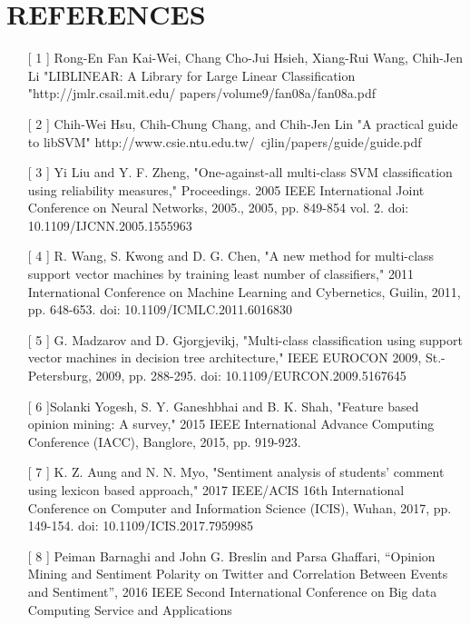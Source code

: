 \chapter{REFERENCES}
\begin{enumerate}
\item[[ 1]]{ Rong-En Fan Kai-Wei, Chang Cho-Jui Hsieh, Xiang-Rui Wang, Chih-Jen Li "LIBLINEAR: A Library for Large Linear Classification "http://jmlr.csail.mit.edu/
papers/volume9/fan08a/fan08a.pdf}

\item[[ 2]]{  Chih-Wei Hsu, Chih-Chung Chang, and Chih-Jen Lin "A practical guide to libSVM" http://www.csie.ntu.edu.tw/~cjlin/papers/guide/guide.pdf}

\item[[ 3]]{ Yi Liu and Y. F. Zheng, "One-against-all multi-class SVM classification using reliability measures," Proceedings. 2005 IEEE International Joint Conference on Neural Networks, 2005., 2005, pp. 849-854 vol. 2.
doi: 10.1109/IJCNN.2005.1555963}

\item[[ 4]]{ R. Wang, S. Kwong and D. G. Chen, "A new method for multi-class support vector machines by training least number of classifiers," 2011 International Conference on Machine Learning and Cybernetics, Guilin, 2011, pp. 648-653.
doi: 10.1109/ICMLC.2011.6016830}

\item[[ 5]]{ G. Madzarov and D. Gjorgjevikj, "Multi-class classification using support vector machines in decision tree architecture," IEEE EUROCON 2009, St.-Petersburg, 2009, pp. 288-295.
doi: 10.1109/EURCON.2009.5167645}

\item[[ 6]]{Solanki Yogesh,	S. Y. Ganeshbhai and B. K. Shah, "Feature based opinion mining: A survey," 2015 IEEE International Advance Computing Conference (IACC), Banglore, 2015, pp. 919-923.	
}
\item[[ 7]] { K. Z. Aung and N. N. Myo, "Sentiment analysis of students' comment using lexicon based approach," 2017 IEEE/ACIS 16th International Conference on Computer and Information Science (ICIS), Wuhan, 2017, pp. 149-154.
	doi: 10.1109/ICIS.2017.7959985}

\item[[ 8]] {Peiman Barnaghi and John G. Breslin and Parsa Ghaffari, “Opinion Mining and Sentiment Polarity on Twitter and Correlation Between Events and Sentiment”, 2016 IEEE Second International Conference on Big data Computing Service and Applications
}

\end{enumerate}
